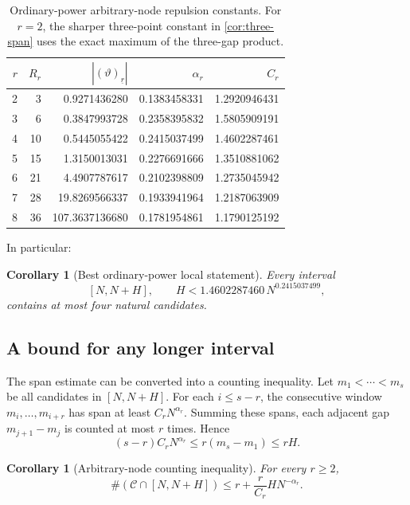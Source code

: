 \documentclass[11pt,oneside]{article}
\newtheorem{corollary}[theorem]{Corollary}
\theoremstyle{definition}
\theoremstyle{remark}
\newcommand{\thetaq}{\vartheta}
\newcommand{\Cand}{\mathcal C}
\newcommand{\fall}[2]{\left(#1\right)_{\!\underline{#2}}}
\begin{document}
\begin{table}[ht]
\centering
\small
\begin{tabular}{rrrrr}
\toprule
$r$ & $R_r$ & $|\fall{\thetaq}{r}|$ & $\alpha_r$ & $C_r$ \\
\midrule
2 & 3  & 0.9271436280 & 0.1383458331 & 1.2920946431 \\
3 & 6  & 0.3847993728 & 0.2358395832 & 1.5805909191 \\
4 & 10 & 0.5445055422 & 0.2415037499 & 1.4602287461 \\
5 & 15 & 1.3150013031 & 0.2276691666 & 1.3510881062 \\
6 & 21 & 4.4907787617 & 0.2102398809 & 1.2735045942 \\
7 & 28 & 19.8269566337 & 0.1933941964 & 1.2187063909 \\
8 & 36 & 107.3637136680 & 0.1781954861 & 1.1790125192 \\
\bottomrule
\end{tabular}
\caption{Ordinary-power arbitrary-node repulsion constants.  For $r=2$, the sharper
three-point constant in \cref{cor:three-span} uses the exact maximum of the three-gap product.}
\label{tab:ordinary-constants}
\end{table}

In particular:

\begin{corollary}[Best ordinary-power local statement]
\label{cor:four-span}
Every interval
\[
 [N,N+H],
 \qquad H<1.4602287460\,N^{0.2415037499},
\]
contains at most four natural candidates.
\end{corollary}

\subsection{A bound for any longer interval}

The span estimate can be converted into a counting inequality.  Let
$m_1<\cdots<m_s$ be all candidates in $[N,N+H]$.  For each $i\le s-r$, the consecutive
window $m_i,\ldots,m_{i+r}$ has span at least $C_rN^{\alpha_r}$.  Summing these spans, each
adjacent gap $m_{j+1}-m_j$ is counted at most $r$ times.  Hence
\[
 (s-r)C_rN^{\alpha_r}
 \le r(m_s-m_1)
 \le rH.
\]

\begin{corollary}[Arbitrary-node counting inequality]
\label{cor:ordinary-count}
For every $r\ge2$,
\begin{equation}
 \#(\Cand\cap[N,N+H])
 \le r+\frac{r}{C_r}H N^{-\alpha_r}.
 \label{eq:ordinary-count}
\end{equation}
\end{corollary}
\end{document}
